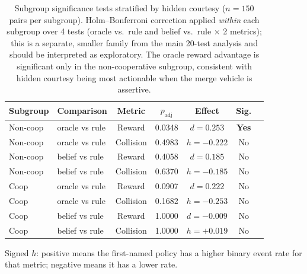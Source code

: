 \begin{table}[htbp]
\centering
\caption{Subgroup significance tests stratified by hidden courtesy
  ($n{=}150$ pairs per subgroup).
  Holm--Bonferroni correction applied \emph{within} each subgroup over
  4 tests (oracle vs.\ rule and belief vs.\ rule $\times$ 2 metrics);
  this is a separate, smaller family from the main 20-test analysis and
  should be interpreted as exploratory.
  The oracle reward advantage is significant only in the non-cooperative
  subgroup, consistent with hidden courtesy being most actionable
  when the merge vehicle is assertive.}
\label{tab:sig_by_courtesy}
\small
\begin{tabular}{llccccc}
\toprule
\textbf{Subgroup} & \textbf{Comparison} & \textbf{Metric} & $p_\text{adj}$ & \textbf{Effect} & \textbf{Sig.} \\
\midrule
Non-coop & oracle vs rule & Reward & 0.0348 & $d=0.253$ & \textbf{Yes} \\
Non-coop & oracle vs rule & Collision & 0.4983 & $h=-0.222$ & No \\
Non-coop & belief vs rule & Reward & 0.4058 & $d=0.185$ & No \\
Non-coop & belief vs rule & Collision & 0.6370 & $h=-0.185$ & No \\
\addlinespace
Coop & oracle vs rule & Reward & 0.0907 & $d=0.222$ & No \\
Coop & oracle vs rule & Collision & 0.1682 & $h=-0.253$ & No \\
Coop & belief vs rule & Reward & 1.0000 & $d=-0.009$ & No \\
Coop & belief vs rule & Collision & 1.0000 & $h=+0.019$ & No \\
\bottomrule
\end{tabular}
\begin{tablenotes}
\small
\item Signed $h$: positive means the first-named policy has a higher binary
  event rate for that metric; negative means it has a lower rate.
\end{tablenotes}
\end{table}
